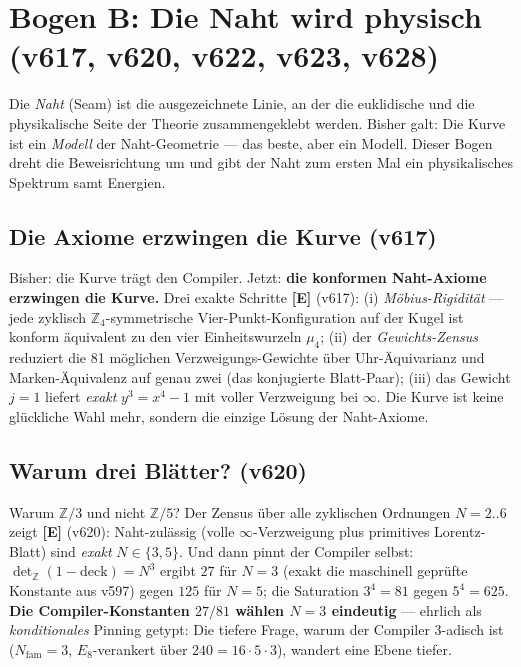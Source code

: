 \documentclass[11pt,a4paper]{article}
\newcommand{\E}{\textcolor{gut}{\textbf{[E]}}}
\begin{document}
\section{Bogen B: Die Naht wird physisch (v617, v620, v622, v623, v628)}

Die \emph{Naht} (Seam) ist die ausgezeichnete Linie, an der die
euklidische und die physikalische Seite der Theorie
zusammengeklebt werden. Bisher galt: Die Kurve ist ein \emph{Modell}
der Naht-Geometrie --- das beste, aber ein Modell. Dieser Bogen dreht
die Beweisrichtung um und gibt der Naht zum ersten Mal ein
physikalisches Spektrum samt Energien.

\subsection*{Die Axiome erzwingen die Kurve (v617)}

Bisher: \glqq{}die Kurve trägt den Compiler.\grqq{} Jetzt:
\textbf{\glqq{}die konformen Naht-Axiome erzwingen die
Kurve.\grqq{}} Drei exakte Schritte \E{} (v617): (i)
\emph{Möbius-Rigidität} --- jede zyklisch $\mathbb{Z}_4$-symmetrische
Vier-Punkt-Konfiguration auf der Kugel ist konform äquivalent zu den
vier Einheitswurzeln $\mu_4$; (ii) der \emph{Gewichts-Zensus}
reduziert die 81 möglichen Verzweigungs-Gewichte über
Uhr-Äquivarianz und Marken-Äquivalenz auf genau zwei (das konjugierte
Blatt-Paar); (iii) das Gewicht $j = 1$ liefert \emph{exakt}
$y^3 = x^4 - 1$ mit voller Verzweigung bei $\infty$. Die Kurve ist
keine glückliche Wahl mehr, sondern die einzige Lösung der
Naht-Axiome.

\subsection*{Warum drei Blätter? (v620)}

Warum $\mathbb{Z}/3$ und nicht $\mathbb{Z}/5$? Der Zensus über alle
zyklischen Ordnungen $N = 2..6$ zeigt \E{} (v620): Naht-zulässig
(volle $\infty$-Verzweigung plus primitives Lorentz-Blatt) sind
\emph{exakt} $N \in \{3, 5\}$. Und dann pinnt der Compiler selbst:
$\det_{\mathbb{Z}}(1 - \mathrm{deck}) = N^3$ ergibt $27$ für $N = 3$
(exakt die maschinell geprüfte Konstante aus v597) gegen $125$ für
$N = 5$; die Saturation $3^4 = 81$ gegen $5^4 = 625$. \textbf{Die
Compiler-Konstanten $27/81$ wählen $N = 3$ eindeutig} --- ehrlich als
\emph{konditionales} Pinning getypt: Die tiefere Frage, warum der
Compiler 3-adisch ist ($N_{\mathrm{fam}} = 3$, $E_8$-verankert über
$240 = 16 \cdot 5 \cdot 3$), wandert eine Ebene tiefer.
\end{document}
